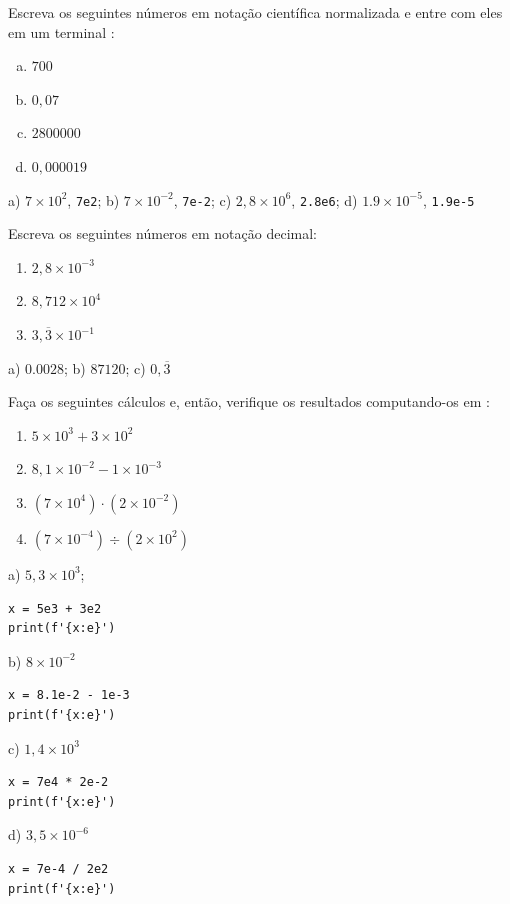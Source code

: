 \begin{exer}
  Escreva os seguintes números em notação científica normalizada e entre com eles em um terminal {\python}:
  \begin{enumerate}[a)]
  \item $700$
  \item $0,07$
  \item $2800000$
  \item $0,000019$
  \end{enumerate}
\end{exer}
\begin{resp}
  a) $7\times 10^2$, \lstinline+7e2+; b) $7\times 10^{-2}$, \lstinline+7e-2+; c) $2,8\times 10^6$, \lstinline+2.8e6+; d) $1.9\times 10^{-5}$, \lstinline+1.9e-5+
\end{resp}

\begin{exer}
  Escreva os seguintes números em notação decimal:
  \begin{enumerate}
  \item $2,8\times 10^{-3}$
  \item $8,712\times 10^4$
  \item $3,\overline{3}\times 10^{-1}$
  \end{enumerate}
\end{exer}
\begin{resp}
  a) $0.0028$; b) $87120$; c) $0,\overline{3}$
\end{resp}

\begin{exer}
  Faça os seguintes cálculos e, então, verifique os resultados computando-os em {\python}:
  \begin{enumerate}
  \item $5\times 10^{3} + 3\times 10^{2}$
  \item $8,1\times 10^{-2} - 1\times 10^{-3}$
  \item $\left(7\times 10^4\right)\cdot (2\times 10^{-2})$
  \item $\left(7\times 10^{-4}\right)\div (2\times 10^{2})$
  \end{enumerate}
\end{exer}
\begin{resp}
  a) $5,3\times 10^3$;

\begin{lstlisting}
x = 5e3 + 3e2
print(f'{x:e}')
\end{lstlisting}
  
  b) $8\times 10^{-2}$

\begin{lstlisting}
x = 8.1e-2 - 1e-3
print(f'{x:e}')
\end{lstlisting}

  c) $1,4\times 10^{3}$

\begin{lstlisting}
x = 7e4 * 2e-2
print(f'{x:e}')
\end{lstlisting}

  d) $3,5\times 10^{-6}$

\begin{lstlisting}
x = 7e-4 / 2e2
print(f'{x:e}')
\end{lstlisting}

\end{resp}


